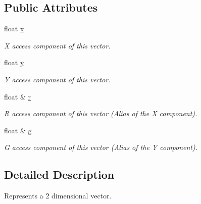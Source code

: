 \subsection*{Public Attributes}
\begin{DoxyCompactItemize}
\item 
\hypertarget{classchaos_1_1gfx_1_1_vector2_a98989a2809ad9c6ac3091550ad5f5118}{}float \hyperlink{classchaos_1_1gfx_1_1_vector2_a98989a2809ad9c6ac3091550ad5f5118}{x}\label{classchaos_1_1gfx_1_1_vector2_a98989a2809ad9c6ac3091550ad5f5118}

\begin{DoxyCompactList}\small\item\em X access component of this vector. \end{DoxyCompactList}\item 
\hypertarget{classchaos_1_1gfx_1_1_vector2_adf4d8ed8e49c84c2fe1596c2b9d55d49}{}float \hyperlink{classchaos_1_1gfx_1_1_vector2_adf4d8ed8e49c84c2fe1596c2b9d55d49}{y}\label{classchaos_1_1gfx_1_1_vector2_adf4d8ed8e49c84c2fe1596c2b9d55d49}

\begin{DoxyCompactList}\small\item\em Y access component of this vector. \end{DoxyCompactList}\item 
\hypertarget{classchaos_1_1gfx_1_1_vector2_a8d73d9df20f4653e3d9ea01264b1b0c7}{}float \& \hyperlink{classchaos_1_1gfx_1_1_vector2_a8d73d9df20f4653e3d9ea01264b1b0c7}{r}\label{classchaos_1_1gfx_1_1_vector2_a8d73d9df20f4653e3d9ea01264b1b0c7}

\begin{DoxyCompactList}\small\item\em R access component of this vector (Alias of the X component). \end{DoxyCompactList}\item 
\hypertarget{classchaos_1_1gfx_1_1_vector2_aac258d8c196b9f734121f7ba67c0059f}{}float \& \hyperlink{classchaos_1_1gfx_1_1_vector2_aac258d8c196b9f734121f7ba67c0059f}{g}\label{classchaos_1_1gfx_1_1_vector2_aac258d8c196b9f734121f7ba67c0059f}

\begin{DoxyCompactList}\small\item\em G access component of this vector (Alias of the Y component). \end{DoxyCompactList}\end{DoxyCompactItemize}


\subsection{Detailed Description}
Represents a 2 dimensional vector. 

